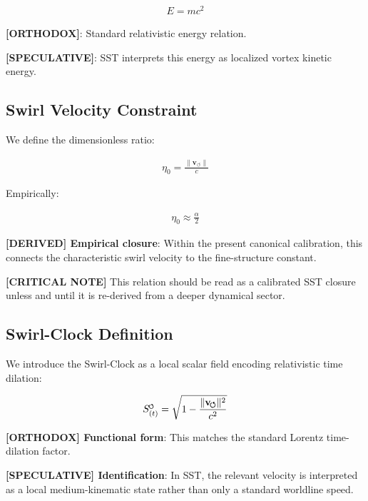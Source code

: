 \documentclass[11pt]{article}
\theoremstyle{definition}
\theoremstyle{plain}
\theoremstyle{remark}
\newcommand{\swirlarrow}{\mathchoice{\mkern-2mu\scriptstyle\boldsymbol{\circlearrowleft}}{\mkern-2mu\scriptstyle\boldsymbol{\circlearrowleft}}{\mkern-2mu\scriptscriptstyle\boldsymbol{\circlearrowleft}}{\mkern-2mu\scriptscriptstyle\boldsymbol{\circlearrowleft}}}
\newcommand{\SwirlClock}{{S_{(t)}^{\swirlarrow}}}
\newcommand{\vnorm}{\lVert \mathbf{v}_{\!\boldsymbol{\circlearrowleft}} \rVert}
\begin{document}
        \begin{align}
            E = m c^2
        \end{align}
        
        \textbf{[ORTHODOX]}: Standard relativistic energy relation.
        
        \textbf{[SPECULATIVE]}: SST interprets this energy as localized vortex kinetic energy.
    
    \subsection{Swirl Velocity Constraint}
        
        We define the dimensionless ratio:
        
        \begin{align}
            \eta_0 = \frac{\vnorm}{c}
        \end{align}
        
        Empirically:
        
        \begin{align}
            \eta_0 \approx \frac{\alpha}{2}
        \end{align}
        
        \textbf{[DERIVED] Empirical closure}: Within the present canonical calibration, this connects the characteristic swirl velocity to the fine-structure constant.

        \textbf{[CRITICAL NOTE]} This relation should be read as a calibrated SST closure unless and until it is re-derived from a deeper dynamical sector.
    
    \subsection{Swirl-Clock Definition}
        
        We introduce the Swirl-Clock as a local scalar field encoding relativistic time dilation:
        
        \begin{align}
            \SwirlClock = \sqrt{1 - \frac{\vnorm^2}{c^2}}
            \label{eq:swirl_clock}
        \end{align}
        
        \textbf{[ORTHODOX] Functional form}: This matches the standard Lorentz time-dilation factor.

        \textbf{[SPECULATIVE] Identification}: In SST, the relevant velocity is interpreted as a local medium-kinematic state rather than only a standard worldline speed.
\end{document}
